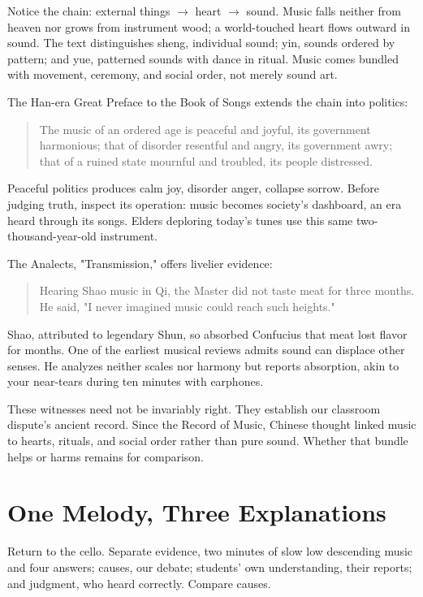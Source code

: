 Notice the chain: external things $\rightarrow$ heart $\rightarrow$ sound. Music falls neither from heaven nor grows from instrument wood; a world-touched heart flows outward in sound. The text distinguishes sheng, individual sound; yin, sounds ordered by pattern; and yue, patterned sounds with dance in ritual. Music comes bundled with movement, ceremony, and social order, not merely sound art.

The Han-era Great Preface to the Book of Songs extends the chain into politics:

\begin{quote}
The music of an ordered age is peaceful and joyful, its government harmonious; that of disorder resentful and angry, its government awry; that of a ruined state mournful and troubled, its people distressed.
\end{quote}
Peaceful politics produces calm joy, disorder anger, collapse sorrow. Before judging truth, inspect its operation: music becomes society's dashboard, an era heard through its songs. Elders deploring today's tunes use this same two-thousand-year-old instrument.

The Analects, "Transmission," offers livelier evidence:

\begin{quote}
Hearing Shao music in Qi, the Master did not taste meat for three months. He said, "I never imagined music could reach such heights."
\end{quote}
Shao, attributed to legendary Shun, so absorbed Confucius that meat lost flavor for months. One of the earliest musical reviews admits sound can displace other senses. He analyzes neither scales nor harmony but reports absorption, akin to your near-tears during ten minutes with earphones.

These witnesses need not be invariably right. They establish our classroom dispute's ancient record. Since the Record of Music, Chinese thought linked music to hearts, rituals, and social order rather than pure sound. Whether that bundle helps or harms remains for comparison.

\section{One Melody, Three Explanations}
Return to the cello. Separate evidence, two minutes of slow low descending music and four answers; causes, our debate; students' own understanding, their reports; and judgment, who heard correctly. Compare causes.

